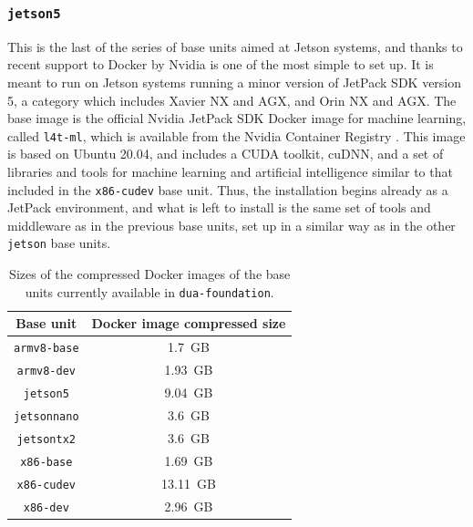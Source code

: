\subsubsection{\texttt{jetson5}}
\label{sec:dua_base_units_jetson5}
This is the last of the series of base units aimed at Jetson systems, and thanks to recent support to Docker by Nvidia is one of the most simple to set up. It is meant to run on Jetson systems running a minor version of JetPack SDK version 5, a category which includes Xavier NX and AGX, and Orin NX and AGX. The base image is the official Nvidia JetPack SDK Docker image for machine learning, called \texttt{l4t-ml}, which is available from the Nvidia Container Registry \cite{nvidia_nvidia_nodate}. This image is based on Ubuntu 20.04, and includes a CUDA toolkit, cuDNN, and a set of libraries and tools for machine learning and artificial intelligence similar to that included in the \texttt{x86-cudev} base unit. Thus, the installation begins already as a JetPack environment, and what is left to install is the same set of tools and middleware as in the previous base units, set up in a similar way as in the other \texttt{jetson} base units.

\begin{table}[ht]
  \centering
  \makeatletter
  \begin{tabular}{|c|c|}
    \hline
    \textbf{Base unit} & \textbf{Docker image compressed size} \\
    \hline
    \texttt{armv8-base} & \SI{1.7}{GB} \\
    \hline
    \texttt{armv8-dev} & \SI{1.93}{GB} \\
    \hline
    \texttt{jetson5} & \SI{9.04}{GB} \\
    \hline
    \texttt{jetsonnano} & \SI{3.6}{GB} \\
    \hline
    \texttt{jetsontx2} & \SI{3.6}{GB} \\
    \hline
    \texttt{x86-base} & \SI{1.69}{GB} \\
    \hline
    \texttt{x86-cudev} & \SI{13.11}{GB} \\
    \hline
    \texttt{x86-dev} & \SI{2.96}{GB} \\
    \hline
  \end{tabular}
  \makeatother
  \caption{Sizes of the compressed Docker images of the base units currently available in \texttt{dua-foundation}.}
  \label{tab:dua_sizes}
\end{table}

